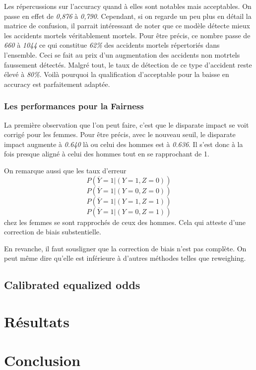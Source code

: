 \documentclass{article}
\begin{document}
    Les répercussions sur l'accuracy quand à elles sont notables mais acceptables. On passe en effet de \textit{0,876} à \textit{0,790}.
    Cependant, si on regarde un peu plus en détail la matrice de confusion, il parrait intéressant de noter que ce modèle détecte mieux 
    les accidents mortels véritablement mortels. Pour être précis, ce nombre passe de \textit{660} à \textit{1044} ce qui constitue  \textit{62\%} des accidents
    mortels répertoriés dans l'ensemble. Ceci se fait au prix d'un augmentation des accidents non motrtels faussement détectés. Malgré tout, 
    le taux de détection de ce type d'accident reste élevé à \textit{80\%}. Voilà pourquoi la qualification d'acceptable pour la baisse en 
    accuracy est parfaitement adaptée.

    \subsubsection{Les performances pour la Fairness}

    La première observation que l'on peut faire, c'est que le disparate impact se voit corrigé pour les femmes. Pour être précis, avec le nouveau seuil, le disparate impact
    augmente à \textit{0.640} là ou celui des hommes est à \textit{0.636}. Il s'est donc à la fois presque aligné à celui des hommes tout en se rapprochant de 1. 
    
    On remarque aussi que les taux d'erreur 
    \[ P(\overline{Y}=1| (Y=1, Z=0)) \] \[ P(\overline{Y}=1| (Y=0, Z=0)) \] \[ P(\overline{Y}=1| (Y=1, Z=1)) \] \[ P(\overline{Y}=1| (Y=0, Z=1)) \] chez les femmes se sont rapprochés de
    ceux des hommes. Cela qui atteste d'une correction de biais substentielle.  

    En revanche, il faut sousligner que la correction de biais n'est pas complète. On peut même dire qu'elle est inférieure à d'autres méthodes telles que reweighing.
    
    \subsection{Calibrated equalized odds}
    
    \section{Résultats}

    \section{Conclusion}
\end{document}
